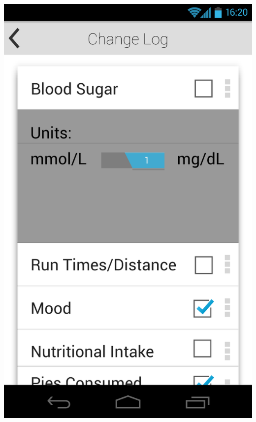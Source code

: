 \documentclass[pdftex,12pt,a4paper]{report}
\begin{document}
\includegraphics[scale=0.18]{Screens/05-Change-Log--Indi-Settings.png}
\end{document}
